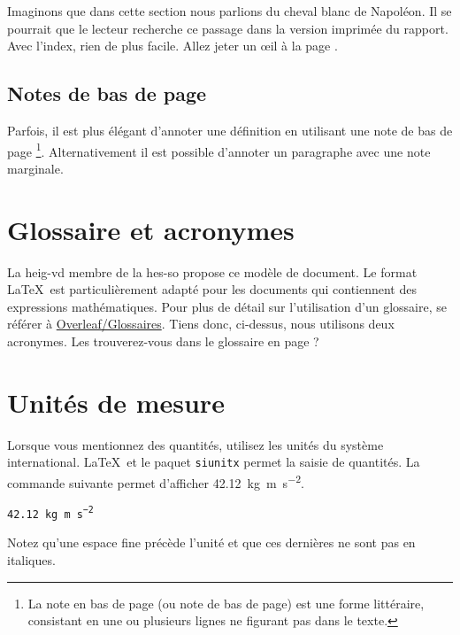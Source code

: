 
Imaginons que dans cette section nous parlions du cheval blanc  de Napoléon. Il se pourrait que le lecteur recherche ce passage dans la version imprimée du rapport. Avec l'index, rien de plus facile. Allez jeter un œil à la page \pageref{index}.

\subsection{Notes de bas de page}

 Parfois, il est plus élégant d'annoter une définition en utilisant une note de bas de page \footnote{La note en bas de page (ou note de bas de page) est une forme littéraire, consistant en une ou plusieurs lignes ne figurant pas dans le texte.}. Alternativement il est possible d'annoter un paragraphe avec une note marginale.

\section{Glossaire et acronymes}

La \Gls{heig-vd} membre de la \Gls{hes-so} propose ce modèle de document. Le format \LaTeX~est particulièrement adapté pour les documents qui contiennent des expressions mathématiques. Pour plus de détail sur l'utilisation d'un glossaire, se référer à \href{https://www.overleaf.com/learn/latex/Glossaries}{Overleaf/Glossaires}. Tiens donc, ci-dessus, nous utilisons deux acronymes. Les trouverez-vous dans le glossaire en page \pageref{glossaire} ?

\section{Unités de mesure}

Lorsque vous mentionnez des quantités, utilisez les unités du système international. \LaTeX~et le paquet \texttt{siunitx} permet la saisie de quantités. La commande suivante permet d'afficher \SI{42.12}{\kilo\gram\metre\per\square\second}.\par

\texttt{\SI{42.12}{\kilo\gram\metre\per\square\second}}\par

Notez qu'une espace fine précède l'unité et que ces dernières ne sont pas en italiques.

